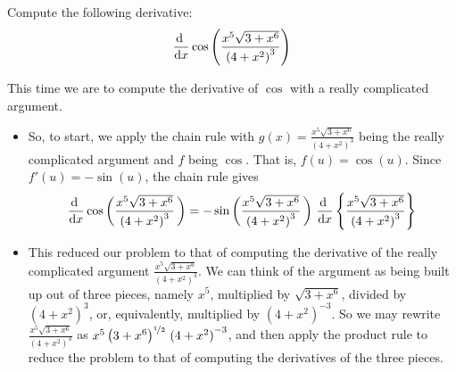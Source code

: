 \goodbreak
\begin{eg}\label{eg:DIFFchainD}
Compute the following derivative:
\begin{align*}
\diff{}{x}\cos\left(\frac{x^5\sqrt{3+x^6}}{{(4+x^2)}^3}\right)
\end{align*}

This time we are to compute the derivative of $\cos$ with a really
complicated argument.
\begin{itemize}
 \item So, to start, we apply
the chain rule with $g(x)=\frac{x^5\sqrt{3+x^6}}{{(4+x^2)}^3}$
being the really complicated argument and $f$ being $\cos$. That is,
$f(u)=\cos(u)$. Since  $f'(u)=-\sin(u)$, the chain rule gives
\begin{align*}
\diff{}{x}\cos\bigg(\frac{x^5\sqrt{3+x^6}}{{(4+x^2)}^3}\,\bigg)
=-\sin\bigg(\frac{x^5\sqrt{3+x^6}}{{(4+x^2)}^3}\,\bigg)\
\diff{}{x} \left\{\frac{x^5\sqrt{3+x^6}}{{(4+x^2)}^3} \right\}
\end{align*}
\item This reduced our problem to that of computing the derivative
of the really complicated argument $\tfrac{x^5\sqrt{3+x^6}}{{(4+x^2)}^3}$.
We can think of the argument as being built up out of three pieces,
namely $x^5$, multiplied by $\sqrt{3+x^6}$, divided by
${(4+x^2)}^3$, or, equivalently, multiplied by ${(4+x^2)}^{-3}$. So we may
rewrite $\tfrac{x^5\sqrt{3+x^6}}{{(4+x^2)}^3}$ as
$x^5\,\big(3+x^6\big)^{\nicefrac{1}{2}}\ {(4+x^2)}^{-3}$,
and then apply the product rule to reduce the problem to that of computing
the derivatives of the three pieces.


\end{itemize}
\end{eg}

